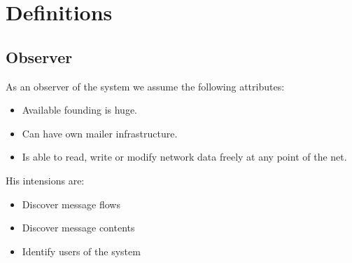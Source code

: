 \documentclass[12pt,journal,compsoc,peerreview]{IEEEtran}
\begin{document}
%


\appendices
\section{Definitions}\label{app:definitions}
\subsection{Observer}
As an observer of the system we assume the following attributes:
\begin{itemize}
	\item Available founding is huge.
	\item Can have own mailer infrastructure.
	\item Is able to read, write or modify network data freely at any point of the net.
\end{itemize}
His intensions are:
\begin{itemize}
	\item Discover message flows
	\item Discover message contents
	\item Identify users of the system
\end{itemize}
\end{document}
